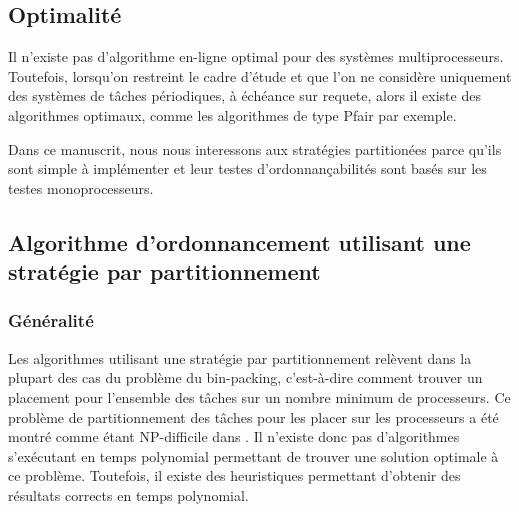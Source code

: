 \subsection{Optimalité}
\begin{theoreme}[\cite{HL92}]
Il n'existe pas d'algorithme en-ligne optimal pour des systèmes
multiprocesseurs. Toutefois, lorsqu'on restreint le cadre d'étude et
que l'on ne considère uniquement des systèmes de tâches périodiques, à
échéance sur requete, alors il existe des algorithmes optimaux, comme
les algorithmes de type Pfair par exemple.
\end{theoreme}

Dans ce manuscrit, nous nous interessons aux stratégies partitionées
parce qu'ils sont simple à implémenter et leur testes
d'ordonnançabilités sont basés sur les testes monoprocesseurs.


\subsection{Algorithme d'ordonnancement utilisant une stratégie par partitionnement}

\subsubsection{Généralité}
Les algorithmes utilisant une stratégie par partitionnement relèvent
dans la plupart des cas du problème du bin-packing, c'est-à-dire
comment trouver un placement pour l'ensemble des tâches sur un nombre
minimum de processeurs.  Ce problème de partitionnement des tâches
pour les placer sur les processeurs a été montré comme étant
NP-difficile dans \cite{LW82}. Il n'existe donc pas d'algorithmes
s'exécutant en temps polynomial permettant de trouver une solution
optimale à ce problème. Toutefois, il existe des heuristiques
permettant d'obtenir des résultats corrects en temps polynomial.

